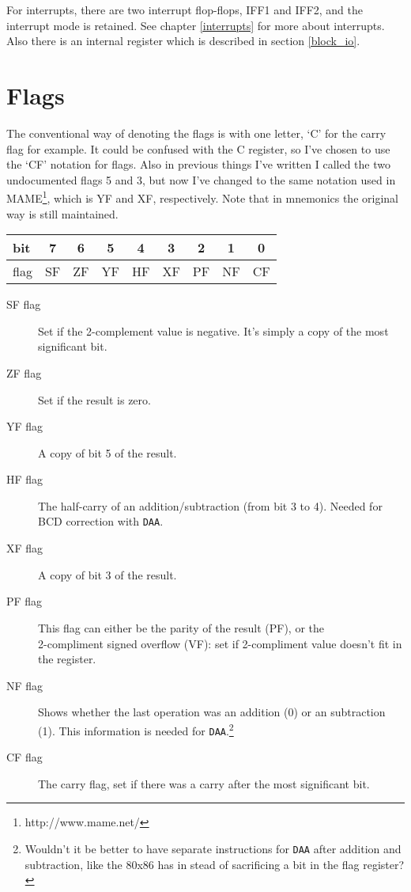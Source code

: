 \documentclass[oneside,a4paper]{book}
\begin{document}
For interrupts, there are two interrupt flop-flops, IFF1 and IFF2, and the 
interrupt mode is retained. See chapter \ref{interrupts} for more about
interrupts. Also there is an internal register which is described in section 
\ref{block_io}.


\section{Flags}
\label{flags}

The conventional way of denoting the flags is with one letter, `C' for
the carry flag for example. It could be confused with the C register, so I've
chosen to use the `CF' notation for flags. Also in previous things I've
written I called the two undocumented flags 5 and 3, but now I've changed
to the same notation used in MAME\footnote{http://www.mame.net/}, which is
YF and XF, respectively. Note that in mnemonics the original way is still
maintained.\\[0.5ex]

\begin{tabular}{|l|c|c|c|c|c|c|c|c|} \hline
bit & 7 & 6 & 5 & 4 & 3 & 2 & 1 & 0 \\ \hline
flag & SF & ZF & YF & HF & XF & PF & NF & CF \\ \hline
\end{tabular}

\begin{description}

\item[SF flag]
  Set if the 2-complement value is negative. It's simply a copy of the most 
  significant bit.

\item[ZF flag]
  Set if the result is zero.

\item[YF flag]
  A copy of bit 5 of the result.

\item[HF flag]
  The half-carry of an addition/subtraction (from bit 3 to 4). Needed for
  BCD correction with {\tt DAA}.

\item[XF flag]
  A copy of bit 3 of the result.

\item[PF flag]
  This flag can either be the parity of the result (PF), or the \\ 2-compliment
  signed overflow (VF): set if 2-compliment value doesn't fit in the register.

\item[NF flag]
  Shows whether the last operation was an addition (0) or an subtraction (1).
  This information is needed for {\tt DAA}.\footnote{Wouldn't it be better to
  have separate instructions for {\tt DAA} after addition and subtraction, 
  like the 80x86 has in stead of sacrificing a bit in the flag register?}

\item[CF flag]
  The carry flag, set if there was a carry after the most significant bit.

\end{description}
\end{document}
